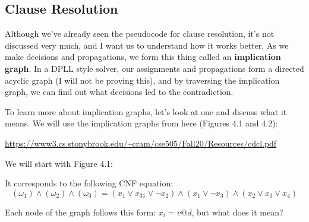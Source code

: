 \subsection{Clause Resolution}

Although we've already seen the pseudocode for clause resolution, it's not discussed very 
much, and I want us to understand how it works better. As we make decisions and propagations, 
we form this thing called an \textbf{implication graph}. In a DPLL style solver, our assignments 
and propagations form a directed acyclic graph (I will not be proving this), and by traversing the
implication graph, we can find out what decisions led to the contradiction.

To learn more about implication graphs, let's look at one and discuss what it means.
We will use the implication graphs from here (Figures 4.1 and 4.2): 
\begin{center}
    \small{\url{https://www3.cs.stonybrook.edu/~cram/cse505/Fall20/Resources/cdcl.pdf}}
\end{center}

We will start with Figure 4.1:


It corresponds to the following CNF equation: 
$$ (\omega_1) \wedge (\omega_2) \wedge (\omega_3) =
(x_1 \vee x_{31} \vee \neg x_2) \wedge (x_1 \vee \neg x_3) \wedge (x_2 \vee x_3 \vee x_4)$$

Each node of the graph follows this form: $x_i = v @ d$, but what does it mean?

